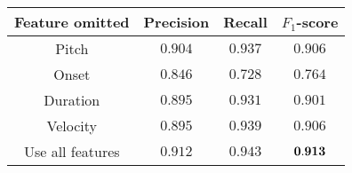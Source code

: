 \begin{tabular}{cccc}
    \textbf{Feature omitted} & Precision & Recall  & $F_1$-score   \\\hline
    Pitch                    & $0.904$   & $0.937$ & $0.906$       \\
    Onset                    & $0.846$   & $0.728$ & $0.764$       \\
    Duration                 & $0.895$   & $0.931$ & $0.901$       \\
    Velocity                 & $0.895$   & $0.939$ & $0.906$       \\
    Use all features         & $0.912$   & $0.943$ & ${\bf 0.913}$ \\
\end{tabular}
